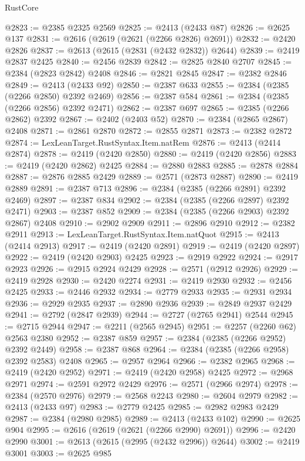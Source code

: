 \begin{lexlean}{RustCore}
\begin{coremodule}
@2823 := @2385 @2325 @2569
@2825 := @2413 (@2433 @87)
@2826 := @2625 @137
@2831 := @2616 (@2619 (@2621 (@2266 @2826) @2691))
@2832 := @2420 @2826
@2837 := @2613 (@2615 (@2831 (@2432 @2832)) @2644)
@2839 := @2419 @2837 @2425
@2840 := @2456 @2839
@2842 := @2825 @2840 @2707
@2845 := @2384 (@2823 @2842) @2408
@2846 := @2821 @2845
@2847 := @2382 @2846
@2849 := @2413 (@2433 @92)
@2850 := @2387 @633
@2855 := @2384 (@2385 (@2266 @2850) @2392 @2469)
@2856 := @2387 @584
@2861 := @2384 (@2385 (@2266 @2856) @2392 @2471)
@2862 := @2387 @697
@2865 := @2385 (@2266 @2862) @2392
@2867 := @2402 (@2403 @52)
@2870 := @2384 (@2865 @2867) @2408
@2871 := @2861 @2870
@2872 := @2855 @2871
@2873 := @2382 @2872
@2874 := LexLeanTarget.RustSyntax.Item.natRem
@2876 := @2413 (@2414 @2874)
@2878 := @2419 (@2420 @2850)
@2880 := @2419 (@2420 @2856)
@2883 := @2419 (@2420 @2862) @2425
@2884 := @2880 @2883
@2885 := @2878 @2884
@2887 := @2876 @2885 @2429
@2889 := @2571 (@2873 @2887)
@2890 := @2419 @2889
@2891 := @2387 @713
@2896 := @2384 (@2385 (@2266 @2891) @2392 @2469)
@2897 := @2387 @834
@2902 := @2384 (@2385 (@2266 @2897) @2392 @2471)
@2903 := @2387 @852
@2909 := @2384 (@2385 (@2266 @2903) @2392 @2867) @2408
@2910 := @2902 @2909
@2911 := @2896 @2910
@2912 := @2382 @2911
@2913 := LexLeanTarget.RustSyntax.Item.natQuot
@2915 := @2413 (@2414 @2913)
@2917 := @2419 (@2420 @2891)
@2919 := @2419 (@2420 @2897)
@2922 := @2419 (@2420 @2903) @2425
@2923 := @2919 @2922
@2924 := @2917 @2923
@2926 := @2915 @2924 @2429
@2928 := @2571 (@2912 @2926)
@2929 := @2419 @2928
@2930 := @2420 @2274
@2931 := @2419 @2930
@2932 := @2456 @2425
@2933 := @2446 @2932
@2934 := @2779 @2933
@2935 := @2931 @2934
@2936 := @2929 @2935
@2937 := @2890 @2936
@2939 := @2849 @2937 @2429
@2941 := @2792 (@2847 @2939)
@2944 := @2727 (@2765 @2941) @2544
@2945 := @2715 @2944
@2947 := @2211 (@2565 @2945)
@2951 := @2257 (@2260 @62) @2563 @2380
@2952 := @2387 @859
@2957 := @2384 (@2385 (@2266 @2952) @2392 @2449)
@2958 := @2387 @868
@2964 := @2384 (@2385 (@2266 @2958) @2392 @2583) @2408
@2965 := @2957 @2964
@2966 := @2382 @2965
@2968 := @2419 (@2420 @2952)
@2971 := @2419 (@2420 @2958) @2425
@2972 := @2968 @2971
@2974 := @2591 @2972 @2429
@2976 := @2571 (@2966 @2974)
@2978 := @2384 (@2570 @2976)
@2979 := @2568 @2243
@2980 := @2604 @2979
@2982 := @2413 (@2433 @97)
@2983 := @2779 @2425
@2985 := @2982 @2983 @2429
@2987 := @2384 (@2980 @2985)
@2989 := @2413 (@2433 @102)
@2990 := @2625 @904
@2995 := @2616 (@2619 (@2621 (@2266 @2990) @2691))
@2996 := @2420 @2990
@3001 := @2613 (@2615 (@2995 (@2432 @2996)) @2644)
@3002 := @2419 @3001
@3003 := @2625 @985

\end{coremodule}
\end{lexlean}
